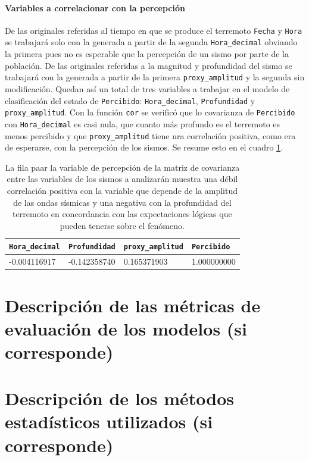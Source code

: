 \documentclass[a4paper]{report}
\begin{document}
\paragraph{Variables a correlacionar con la percepción}
De las originales referidas al tiempo en que se produce el terremoto \verb'Fecha' y \verb'Hora' se trabajará solo con la generada a partir de la segunda \verb'Hora_decimal' obviando la primera pues no es esperable que la percepción de un sismo por parte de la población.
De las originales referidas a la magnitud y profundidad del sismo se trabajará con la generada a partir de la primera \verb'proxy_amplitud' y la segunda sin modificación.
Quedan así un total de tres variables a trabajar en el modelo de clasificación del estado de \verb'Percibido': \verb'Hora_decimal', \verb'Profundidad' y  \verb'proxy_amplitud'.
Con la función \verb'cor' se verificó que lo covarianza de \verb'Percibido' con \verb'Hora_decimal' es casi nula, que cuanto más profundo es el terremoto es menos percibido y que \verb'proxy_amplitud' tiene ura correlación positiva, como era de esperarse, con la percepción de los sismos.
Se resume esto en el cuadro \ref{tab:correlaciones}.
\begin{table}[h]
\centering
\begin{tabular}{llll}
\toprule
\verb'Hora_decimal' & \verb'Profundidad'  & \verb'proxy_amplitud' & \verb'Percibido' \\ 
\midrule
-0.004116917  & -0.142358740  &  0.165371903 &   1.000000000 \\
\bottomrule
\end{tabular}
\caption{La fila paar la variable de percepción de la matriz de covarianza entre las variables de los sismos a analizarán muestra una débil correlación positiva con la variable que depende de la amplitud de las ondas sísmicas y una negativa con la profundidad del terremoto en concordancia con las expectaciones lógicas que pueden tenerse sobre el fenómeno.}
\label{tab:correlaciones}
\end{table}




\section{Descripción de las métricas de evaluación de los modelos (si corresponde)}



\section{Descripción de los métodos estadísticos utilizados (si corresponde)}
\end{document}

